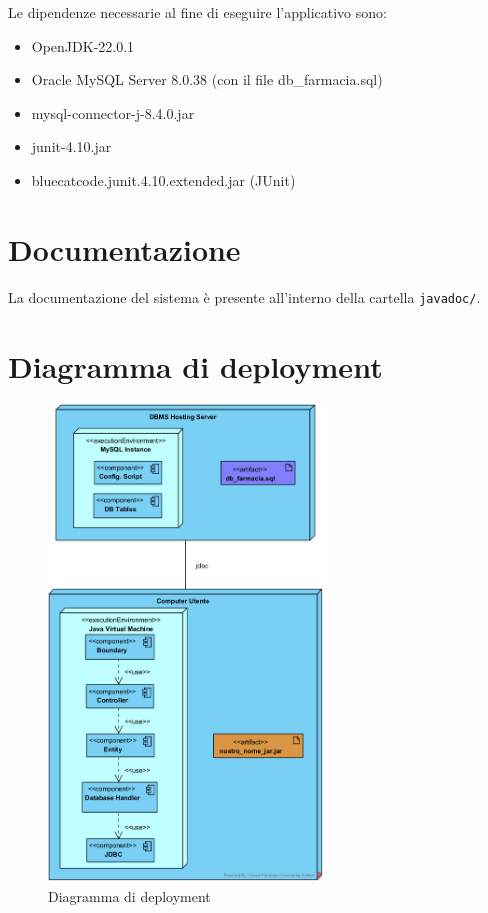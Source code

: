 Le dipendenze necessarie al fine di eseguire l'applicativo sono:
\begin{itemize}
	\item OpenJDK-22.0.1
	\item Oracle MySQL Server 8.0.38 (con il file db\_farmacia.sql)
	\item mysql-connector-j-8.4.0.jar
	\item junit-4.10.jar
	\item bluecatcode.junit.4.10.extended.jar (JUnit)
\end{itemize}

\section{Documentazione}

La documentazione del sistema è presente all'interno della cartella \texttt{javadoc/}.

\vfill
\pagebreak

\section{Diagramma di deployment}

\begin{figure}[h]
	\centering
	\includegraphics[width=0.65\textwidth]{assets/DeploymentFarmacia.png}
	\caption{Diagramma di deployment}
	\label{diag:deployment}
\end{figure}
